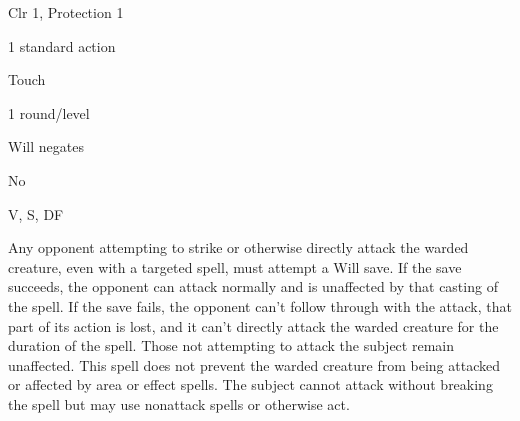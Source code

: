 
\begin{description*}
\item[Level:] Clr 1, Protection 1
\item[Casting Time:] 1 standard action
\item[Range:] Touch
\item[Duration:] 1 round/level
\item[Saving Throw:] Will negates
\item[Spell Resistance:] No
\item[Components:] V, S, DF
\end{description*}

Any opponent attempting to strike or otherwise directly attack the warded creature,
even with a targeted spell, must attempt a Will save. If the save succeeds, the
opponent can attack normally and is unaffected by that casting of the spell. If
the save fails, the opponent can't follow through with the attack, that part of
its action is lost, and it can't directly attack the warded creature for the duration
of the spell. Those not attempting to attack the subject remain unaffected. This
spell does not prevent the warded creature from being attacked or affected by area
or effect spells. The subject cannot attack without breaking the spell but may
use nonattack spells or otherwise act.